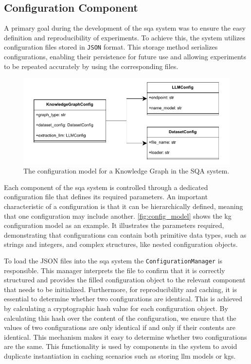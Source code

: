 \subsection{Configuration Component}
\label{sec:sqas_architecture_configuration}

A primary goal during the development of the \gls{sqa} system was to ensure the easy definition and reproducibility of experiments. To achieve this, the system utilizes configuration files stored in \texttt{JSON} format. This storage method serializes configurations, enabling their persistence for future use and allowing experiments to be repeated accurately by using the corresponding files.

\begin{figure}
    \centering
    \includegraphics[width=0.90\linewidth]{figures/framework/figures-Bsp_Config_Model.drawio.pdf}
    \caption[Knowledge Graph Configuration Model]{The configuration model for a Knowledge Graph in the SQA system.}
    \label{fig:config_model}
\end{figure}

Each component of the \gls{sqa} system is controlled through a dedicated configuration file that defines its required parameters. An important characteristic of a configuration is that it can be hierarchically defined, meaning that one configuration may include another. \autoref{fig:config_model} shows the \gls{kg} configuration model as an example. It illustrates the parameters required, demonstrating that configurations can contain both primitive data types, such as strings and integers, and complex structures, like nested configuration objects.

To load the JSON files into the \gls{sqa} system the \texttt{ConfigurationManager} is responsible. This manager interprets the file to confirm that it is correctly structured and provides the filled configuration object to the relevant component that needs to be initialized. Furthermore, for reproducibility and caching, it is essential to determine whether two configurations are identical. This is achieved by calculating a cryptographic hash value for each configuration object. By calculating this hash over the content of the configuration, we ensure that the values of two configurations are only identical if and only if their contents are identical. This mechanism makes it easy to determine whether two configurations are the same. This functionality is used by components in the system to avoid duplicate instantiation in caching scenarios such as storing \gls{llm} models or \glspl{kg}. 



